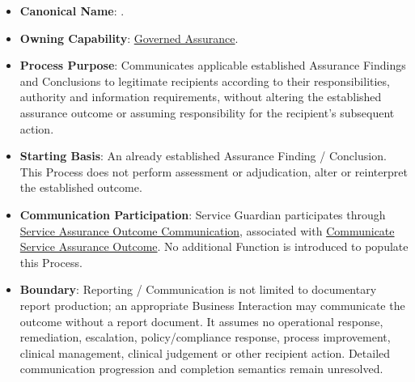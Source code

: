 \begin{itemize}

\item 
\textbf{Canonical Name}: \texttt{}.



\item 
\textbf{Owning Capability}: \hyperref[rad:enabling:694]{Governed Assurance}.



\item 
\textbf{Process Purpose}: Communicates applicable established Assurance Findings and Conclusions to legitimate recipients according to their responsibilities, authority and information requirements, without altering the established assurance outcome or assuming responsibility for the recipient's subsequent action.



\item 
\textbf{Starting Basis}: An already established Assurance Finding /\allowbreak{} Conclusion. This Process does not perform assessment or adjudication, alter or reinterpret the established outcome.



\item 
\textbf{Communication Participation}: Service Guardian participates through \href{https://github.com/fhirfactory/harmonia/blob/98410db60155198a75f74c79d98060070209faa1/docs/markdown/03-business-architecture/collaborations-interactions/interactions.md\#service-assurance-outcome-communication}{Service Assurance Outcome Communication}, associated with \href{https://github.com/fhirfactory/harmonia/blob/98410db60155198a75f74c79d98060070209faa1/docs/markdown/03-business-architecture/behaviours/health-service-assurance.md\#communicate-service-assurance-outcome}{Communicate Service Assurance Outcome}. No additional Function is introduced to populate this Process.



\item 
\textbf{Boundary}: Reporting /\allowbreak{} Communication is not limited to documentary report production; an appropriate Business Interaction may communicate the outcome without a report document. It assumes no operational response, remediation, escalation, policy/\allowbreak{}compliance response, process improvement, clinical management, clinical judgement or other recipient action. Detailed communication progression and completion semantics remain unresolved.



\end{itemize}
\label{rad:processes:398}
